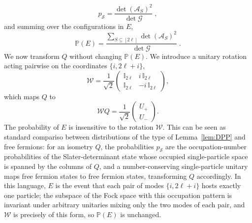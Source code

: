 \documentclass[prx,twocolumn,superscriptaddress,aps,10pt, frontmatterverbose, reprint,footinbib,longbibliography=true]{revtex4-2}
\begin{document}
\begin{equation}
   p_{\mathcal{S}}=\frac{\det(\mathcal{A}_S)^2}{\det \mathcal{G}}\;,
\end{equation} 
and summing over the configurations in $E$,
\begin{equation}
\mathbb{P}(E)=\frac{\sum_{S\subseteq[2\ell]}\det(\mathcal{A}_S)^2}{\det \mathcal{G}}\;.
\label{eq:graph-event-A}
\end{equation}
We now transform $Q$ without changing $\mathbb{P}(E)$. 
We introduce a unitary rotation acting pairwise on the coordinates $\{i,2\ell+i\}$,
\begin{equation}
\mathcal{W}=\frac{1}{\sqrt2}\begin{pmatrix} \mathbb{I}_{2\ell}&i\,\mathbb{I}_{2\ell}\\ \mathbb{I}_{2\ell}&-i\,\mathbb{I}_{2\ell}\end{pmatrix},
\end{equation}
which maps $Q$ to
\begin{equation}
    \mathcal{W}Q=\frac{1}{\sqrt2}\begin{pmatrix} U_+\\ U_-\end{pmatrix}.
\end{equation}
The probability of $E$ is insensitive to the rotation $\mathcal{W}$. This can be seen as standard compariso between distributions of the type of Lemma~\ref{lem:DPP} and free fermions: for an isometry $Q$, the probabilities $p_{\mathcal{S}}$ are the occupation-number probabilities of the Slater-determinant state whose occupied single-particle space is spanned by the columns of $Q$, and a number-conserving single-particle unitary maps free fermion states to free fermion states, transforming $Q$ accordingly. In this language, $E$ is the event that each pair of modes $\{i,2\ell+i\}$ hosts exactly one particle; the subspace of the Fock space with this occupation pattern is invariant under arbitrary unitaries mixing only the two modes of each pair, and $\mathcal{W}$ is precisely of this form, so $\mathbb{P}(E)$ is unchanged.
\end{document}
